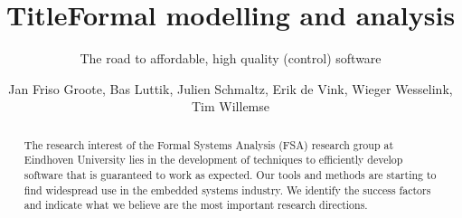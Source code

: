 \documentclass[sigplan,10pt,review]{acmart}\settopmatter{printfolios=true,printccs=false,printacmref=false}
\begin{document}
\title[Short Title]{Title}         %
\title[Short Title]{Formal modelling and analysis} 
\subtitle{The road to affordable, high quality (control) software}



\author{Jan Friso Groote, Bas Luttik, Julien Schmaltz, Erik de Vink, Wieger Wesselink, Tim Willemse\vspace{2ex}}


\begin{abstract}
The research interest of the Formal Systems Analysis (FSA) research group at Eindhoven University lies
in the development of techniques to efficiently develop software that is guaranteed
to work as expected. Our tools and methods are starting to find widespread use in the embedded systems industry. 
We identify the success factors and indicate what we believe are the most important research directions. 
\end{abstract}
\end{document}
